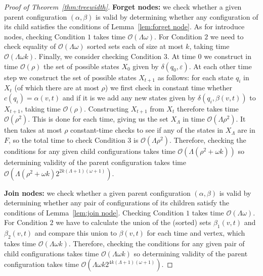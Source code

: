 \documentclass[runningheads]{llncs}
\begin{document}
\begin{proof}[Proof of Theorem~\ref{thm:treewidth}]
\textbf{Forget nodes:} we check whether a given parent configuration $(\alpha,\beta)$ is valid by determining whether any configuration of its child satisfies the conditions of 
 Lemma~\ref{lem:forget node}. As for introduce nodes, checking Condition $1$ takes time $\mathcal{O}(\Lambda \omega)$.
For Condition $2$ we need to check equality of $\mathcal{O}(\Lambda \omega)$ sorted sets each of size at most $k$, taking time $\mathcal{O}(\Lambda\omega k)$. 
Finally, we consider checking Condition $3$. 
At time $0$ we construct in time $\mathcal{O}(\rho)$ the set of possible states $X_0$ given by $\delta(q_0,\varepsilon)$. At each other time step we construct the set of possible states $X_{t+1}$ as follows:
for each state $q_i$ in $X_t$ (of which there are at most $\rho$) we first check in constant time whether $c(q_i)=\alpha(v,t)$ and if it is we add any new states given by $\delta(q_i,\beta(v,t))$ to $X_{t+1}$, taking time $\mathcal{O}(\rho)$. Constructing $X_{t+1}$ from $X_t$ therefore takes time $\mathcal{O}(\rho^2)$.
This is done for each time, giving us the set $X_\Lambda$ in time $\mathcal{O}(\Lambda \rho^2)$. It then takes at most $\rho$ constant-time checks to see if any of the states in $X_\Lambda$ are in $F$, so the total time to check Condition $3$ is $\mathcal{O}(\Lambda \rho ^2)$. Therefore, checking the conditions for any given child configurations takes time $\mathcal{O}(\Lambda(\rho^2+\omega k))$ so determining validity of the parent configuration takes time $\mathcal{O}(\Lambda(\rho^2+\omega k)2^{2k(\Lambda+1)(\omega+1)})$.

\textbf{Join nodes:} we check whether a given parent configuration $(\alpha,\beta)$ is valid by determining whether any pair of configurations of its children satisfy the conditions of Lemma~\ref{lem:join node}.
Checking Condition $1$ takes time $\mathcal{O}(\Lambda \omega)$.
For Condition $2$ we have to calculate the union of the (sorted) sets $\beta_1(v,t)$ and $\beta_2(v,t)$ and compare this union to $\beta(v,t)$ for each time and vertex, which takes time $\mathcal{O}(\Lambda \omega k)$. Therefore, checking the conditions for any given pair of child configurations takes time $\mathcal{O}(\Lambda\omega k)$ so determining validity of the parent configuration takes time $\mathcal{O}(\Lambda\omega k2^{4k(\Lambda+1)(\omega+1)})$.



\end{proof}
\end{document}
